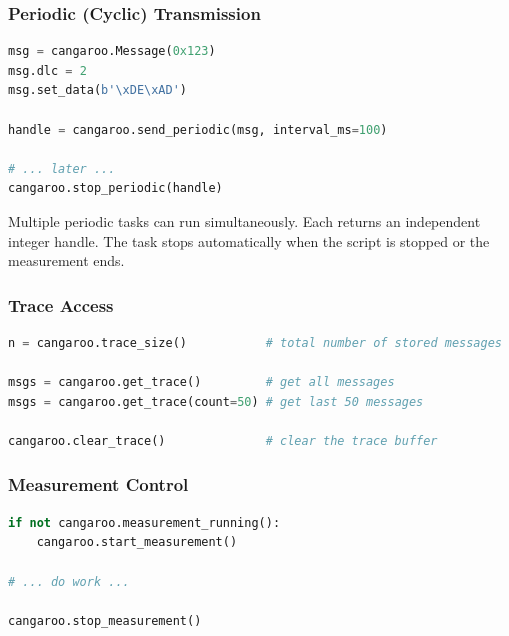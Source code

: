 \documentclass[a4paper,11pt]{article}
\begin{document}
\subsubsection{Periodic (Cyclic) Transmission}

\begin{lstlisting}[language=Python, caption={Send a heartbeat every 100 ms}]
msg = cangaroo.Message(0x123)
msg.dlc = 2
msg.set_data(b'\xDE\xAD')

handle = cangaroo.send_periodic(msg, interval_ms=100)

# ... later ...
cangaroo.stop_periodic(handle)
\end{lstlisting}

Multiple periodic tasks can run simultaneously. Each returns an independent
integer handle. The task stops automatically when the script is stopped or the
measurement ends.

\subsubsection{Trace Access}

\begin{lstlisting}[language=Python, caption={Read from the captured trace}]
n = cangaroo.trace_size()           # total number of stored messages

msgs = cangaroo.get_trace()         # get all messages
msgs = cangaroo.get_trace(count=50) # get last 50 messages

cangaroo.clear_trace()              # clear the trace buffer
\end{lstlisting}

\subsubsection{Measurement Control}

\begin{lstlisting}[language=Python]
if not cangaroo.measurement_running():
    cangaroo.start_measurement()

# ... do work ...

cangaroo.stop_measurement()
\end{lstlisting}

\end{document}
